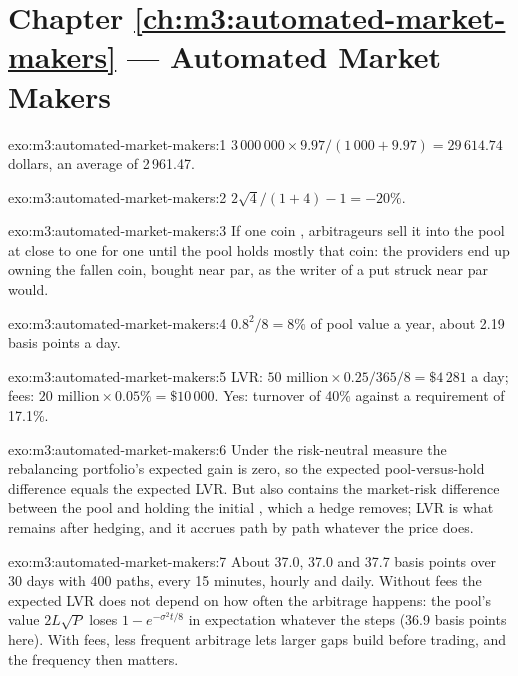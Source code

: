 \section*{Chapter \ref{ch:m3:automated-market-makers} --- Automated Market Makers}

\begin{solution}{exo:m3:automated-market-makers:1}
$3\,000\,000 \times 9.97/(1\,000 + 9.97) = 29\,614.74$ dollars, an average of 2\,961.47.
\end{solution}

\begin{solution}{exo:m3:automated-market-makers:2}
$2\sqrt4/(1 + 4) - 1 = -20\%$.
\end{solution}

\begin{solution}{exo:m3:automated-market-makers:3}
If one coin , arbitrageurs sell it into the pool at close to one for one until the pool holds mostly that coin: the
providers end up owning the fallen coin, bought near par, as the writer of a put struck near par would.
\end{solution}

\begin{solution}{exo:m3:automated-market-makers:4}
$0.8^2/8 = 8\%$ of pool value a year, about 2.19 basis points a day.
\end{solution}

\begin{solution}{exo:m3:automated-market-makers:5}
LVR: $50\text{ million} \times 0.25/365/8 = \$4\,281$ a day; fees: $20\text{ million} \times 0.05\% = \$10\,000$. Yes: turnover of
40\% against a requirement of 17.1\%.
\end{solution}

\begin{solution}{exo:m3:automated-market-makers:6}
Under the risk-neutral measure the rebalancing portfolio's expected gain is zero, so the expected pool-versus-hold difference equals
the expected LVR. But  also contains the market-risk difference between the pool and holding the initial ,
which a hedge removes; LVR is what remains after hedging, and it accrues path by path whatever the price does.
\end{solution}

\begin{solution}{exo:m3:automated-market-makers:7}
About 37.0, 37.0 and 37.7 basis points over 30 days with 400 paths, every 15 minutes, hourly and daily. Without fees the expected LVR
does not depend on how often the arbitrage happens: the pool's value $2L\sqrt{P}$ loses $1 - e^{-\sigma^2t/8}$ in expectation whatever
the steps (36.9 basis points here). With fees, less frequent arbitrage lets larger gaps build before trading, and the frequency then
matters.
\end{solution}

